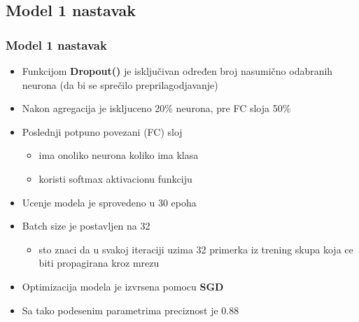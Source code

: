 \documentclass{beamer}
\begin{document}
\subsection{Model 1 nastavak}
\begin{frame}
\frametitle{Model 1 nastavak}

\begin{itemize}

\item Funkcijom \textbf{Dropout()} je isključivan određen broj nasumično odabranih neurona (da bi se sprečilo preprilagodjavanje)
\item Nakon agregacija je iskljuceno 20\% neurona, pre FC sloja 50\%

\item Poslednji potpuno povezani (FC) sloj
\begin{itemize}
\item ima onoliko neurona koliko ima klasa
\item koristi softmax aktivacionu funkciju
\end{itemize}

\item Ucenje modela je sprovedeno u 30 epoha
\item Batch size je postavljen na 32
\begin{itemize}
\item sto znaci da u svakoj iteraciji uzima 32 primerka iz trening skupa koja ce biti propagirana kroz mrezu
\end{itemize}

\item Optimizacija modela je izvrsena pomocu \textbf{SGD}
\item Sa tako podesenim parametrima preciznost je 0.88

\end{itemize}

\end{frame}

\end{document}
